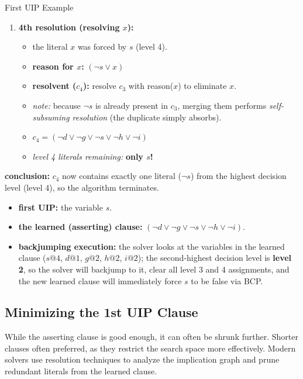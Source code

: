 \documentclass[a4paper, 11pt]{report}
\begin{document}
\begin{gframe}{First UIP Example}
\begin{enumerate}
    \item \textbf{4th resolution (resolving $x$):}
    \begin{itemize}
        \item the literal $x$ was forced by $s$ (level 4).
        \item \textbf{reason for $x$:} $(\neg s \lor x)$
        \item \textbf{resolvent ($c_4$):} resolve $c_3$ with reason($x$) to eliminate $x$. 
        \item \textit{note:} because $\neg s$ is already present in $c_3$, merging them performs \textit{self-subsuming resolution} (the duplicate simply absorbs).
        \item $c_4 = (\neg d \lor \neg g \lor \neg s \lor \neg h \lor \neg i)$
        \item \textit{level 4 literals remaining:} \textbf{only $s$!}
    \end{itemize}
\end{enumerate}

\textbf{conclusion:}
$c_4$ now contains exactly one literal ($\neg s$) from the highest decision level (level 4), so the algorithm terminates. 

\begin{itemize}
    \item \textbf{first UIP:} the variable $s$.
    \item \textbf{the learned (asserting) clause:} $(\neg d \lor \neg g \lor \neg s \lor \neg h \lor \neg i)$. 
    \item \textbf{backjumping execution:} the solver looks at the variables in the learned clause ($s@4$, $d@1$, $g@2$, $h@2$, $i@2$); the second-highest decision level is \textbf{level 2}, so the solver will backjump to it, clear all level 3 and 4 assignments, and the new learned clause will immediately force $s$ to be false via BCP.
\end{itemize}
\end{gframe}

\subsection*{Minimizing the 1st UIP Clause}
While the asserting clause is good enough, it can often be shrunk further. Shorter clauses often preferred, as they restrict the search space more effectively. Modern solvers use resolution techniques to analyze the implication graph and prune redundant literals from the learned clause.
\end{document}
